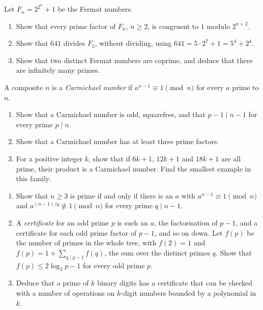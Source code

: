 \begin{exercise}[$\star\star$]\label{pb:fermatnum}
Let $F_n=2^{2^n}+1$ be the Fermat numbers.
\begin{enumerate}[label=(\alph*)]
\item Show that every prime factor of $F_n$, $n\ge2$, is congruent to $1$ modulo $2^{n+2}$.
\item Show that $641$ divides $F_5$, without dividing, using $641=5\cdot2^7+1=5^4+2^4$.
\item Show that two distinct Fermat numbers are coprime, and deduce that there are infinitely many primes.
\end{enumerate}
\end{exercise}

\begin{exercise}[$\star\star$]\label{pb:carmichael}
A composite $n$ is a \emph{Carmichael number} if $a^{n-1}\equiv1\pmod n$ for every $a$ prime to $n$.
\begin{enumerate}[label=(\alph*)]
\item Show that a Carmichael number is odd, squarefree, and that $p-1\mid n-1$ for every prime $p\mid n$.
\item Show that a Carmichael number has at least three prime factors.
\item For a positive integer $k$, show that if $6k+1$, $12k+1$ and $18k+1$ are all prime, their product is a Carmichael number. Find the smallest
example in this family.
\end{enumerate}
\end{exercise}

\begin{exercise}[$\star\star$]\label{pb:pratt}
\begin{enumerate}[label=(\alph*)]
\item Show that $n\ge3$ is prime if and only if there is an $a$ with $a^{n-1}\equiv1\pmod n$ and $a^{(n-1)/q}\not\equiv1\pmod n$
for every prime $q\mid n-1$.
\item A \emph{certificate} for an odd prime $p$ is such an $a$, the factorisation of $p-1$, and a certificate for each odd
prime factor of $p-1$, and so on down. Let $f(p)$ be the number of primes in the whole tree, with $f(2)=1$ and
$f(p)=1+\sum_{q\mid p-1}f(q)$, the sum over the distinct primes $q$. Show that $f(p)\le2\log_2p-1$ for every odd prime $p$.
\item Deduce that a prime of $k$ binary digits has a certificate that can be checked with a number of operations on
$k$-digit numbers bounded by a polynomial in $k$.
\end{enumerate}
\end{exercise}

